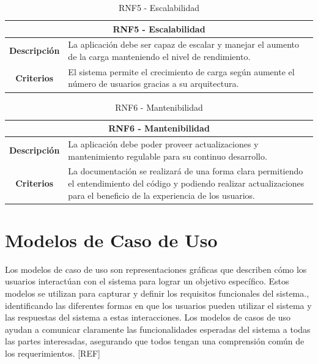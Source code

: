 \begin{table}[H]
    \centering
    \begin{tabular}{|c|p{10cm}|}
        \hline
        \multicolumn{2}{|c|}{\textbf{RNF5 - Escalabilidad}}                                                                                  \\
        \hline
        \textbf{Descripción} & La aplicación debe ser capaz de escalar y manejar el aumento de la carga manteniendo el nivel de rendimiento. \\
        \hline
        \textbf{Criterios}   & El sistema permite el crecimiento de carga según aumente el número de usuarios gracias a su arquitectura.     \\
        \hline
    \end{tabular}
    \caption{RNF5 - Escalabilidad}
\end{table}

\begin{table}[H]
    \centering
    \begin{tabular}{|c|p{10cm}|}
        \hline
        \multicolumn{2}{|c|}{\textbf{RNF6 - Mantenibilidad}}                                                                                                                                                     \\
        \hline
        \textbf{Descripción} & La aplicación debe poder proveer actualizaciones y mantenimiento regulable para su continuo desarrollo.                                                                           \\
        \hline
        \textbf{Criterios}   & La documentación se realizará de una forma clara permitiendo el entendimiento del código y podiendo realizar actualizaciones para el beneficio de la experiencia de los usuarios. \\
        \hline
    \end{tabular}
    \caption{RNF6 - Mantenibilidad}
\end{table}

\section{Modelos de Caso de Uso}

Los modelos de caso de uso son representaciones gráficas que describen cómo los usuarios interactúan con el sistema para lograr un objetivo específico. Estos modelos se utilizan para capturar y definir los requisitos funcionales del sistema., identificando las diferentes formas en que los usuarios pueden utilizar el sistema y las respuestas del sistema a estas interacciones. Los modelos de casos de uso ayudan a comunicar claramente las funcionalidades esperadas del sistema a todas las partes interesadas, asegurando que todos tengan una comprensión común de los requerimientos. [REF]

